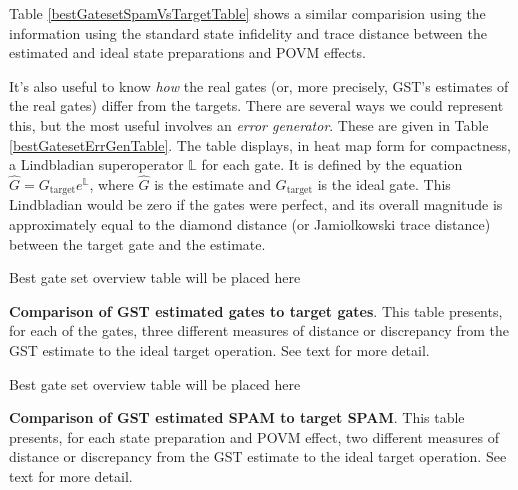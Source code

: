 \documentclass{article}[11pt]
\newcommand{\putfield}[2]{#2}
\begin{document}
Table \ref{bestGatesetSpamVsTargetTable} shows a similar comparision using the information using the standard state infidelity and trace distance between the estimated and ideal state preparations and POVM effects.

It's also useful to know \emph{how} the real gates (or, more precisely, GST's estimates of the real gates) differ from the targets.  There are several ways we could represent this, but the most useful involves an \emph{error generator}.  These are given in Table \ref{bestGatesetErrGenTable}.  The table displays, in heat map form for compactness, a Lindbladian superoperator $\mathbb{L}$ for each gate.  It is defined by the equation $\hat{G} = G_{\mathrm{target}}e^{\mathbb{L}}$, where $\hat{G}$ is the estimate and $G_{\mathrm{target}}$ is the ideal gate.  This Lindbladian would be zero if the gates were perfect, and its overall magnitude is approximately equal to the diamond distance (or Jamiolkowski trace distance) between the target gate and the estimate.

\begin{table}[h]
\begin{center}
\putfield{bestGatesetVsTargetTable}{Best gate set overview table will be placed here}
\caption{\putfield{tt_bestGatesetVsTargetTable}{}\textbf{Comparison of GST estimated gates to target gates}.  This table presents, for each of the gates, three different measures of distance or discrepancy from the GST estimate to the ideal target operation.  See text for more detail.\label{bestGatesetVsTargetTable}}
\end{center}
\end{table}


\begin{table}[h]
\begin{center}
\putfield{bestGatesetSpamVsTargetTable}{Best gate set overview table will be placed here}
\caption{\putfield{tt_bestGatesetSpamVsTargetTable}{}\textbf{Comparison of GST estimated SPAM to target SPAM}.  This table presents, for each state preparation and POVM effect, two different measures of distance or discrepancy from the GST estimate to the ideal target operation.  See text for more detail.\label{bestGatesetSpamVsTargetTable}}
\end{center}
\end{table}
\end{document}

